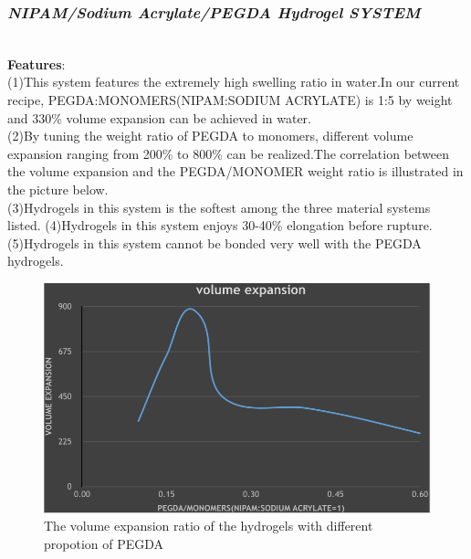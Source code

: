 \documentclass[a4paper]{article}
\begin{document}
\begin{itemize}
\subsubsection{\textit{NIPAM/Sodium Acrylate/PEGDA Hydrogel SYSTEM}}\\
\textbf{Features}:\\
(1)This system features the extremely high swelling ratio in water.In our current recipe, PEGDA:MONOMERS(NIPAM:SODIUM ACRYLATE) is 1:5 by weight and 330\% volume expansion can be achieved in water.\\
(2)By tuning the weight ratio of PEGDA to monomers, different volume expansion ranging from 200\% to 800\% can be realized.The correlation between the volume expansion and the PEGDA/MONOMER weight ratio is illustrated in the picture below.\\
(3)Hydrogels in this system is the softest among the three material systems listed.
(4)Hydrogels in this system enjoys 30-40\% elongation before rupture.
(5)Hydrogels in this system cannot be bonded very well with the PEGDA hydrogels.
\begin{figure}
\centering
\includegraphics[width=400pt]{graph.png}
\caption{The volume expansion ratio of the hydrogels with different propotion of PEGDA}
\end{figure}
\\



\end{itemize}
\end{document}
